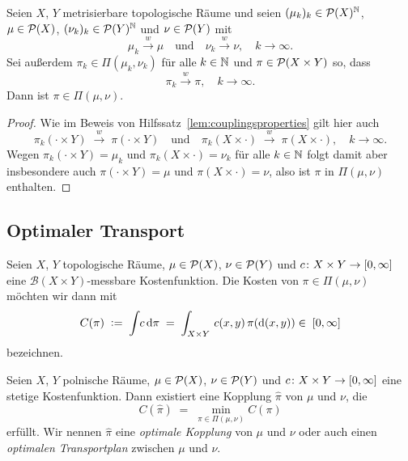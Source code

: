 \documentclass[../main/main.tex]{subfiles}
\begin{document}
	\begin{Hilfssatz}
		\label{lem:convimpliescouplingsconv}
		Seien $X$, $Y$ metrisierbare topologische Räume und seien $(\mu_k)_k \in \mathcal{P}(X)^{\mathbb{N}}$, $\mu \in \mathcal{P}(X)$, $(\nu_k)_k \in \mathcal{P}(Y)^{\mathbb{N}}$ und $\nu \in \mathcal{P}(Y)$ mit
		\[ \mu_k \xrightarrow{w} \mu \quad \text{und} \quad \nu_k \xrightarrow{w} \nu, \quad k \to \infty \text{.} \]
		Sei außerdem $\pi_k \in \Pi(\mu_k, \nu_k)$ für alle $k \in \mathbb{N}$ und $\pi \in \mathcal{P}(X \times Y)$ so, dass
		\[ \pi_k \xrightarrow{w} \pi, \quad k \to \infty \text{.} \]
		Dann ist $\pi \in \Pi(\mu, \nu)$.
	\end{Hilfssatz}

	\begin{proof}
		Wie im Beweis von Hilfssatz~\ref{lem:couplingsproperties} gilt hier auch
		\[ \pi_k(\cdot \times Y) \; \xrightarrow{w} \; \pi(\cdot \times Y) \quad \text{und} \quad \pi_k(X \times \cdot) \; \xrightarrow{w} \; \pi(X \times \cdot), \quad k \to \infty \text{.} \]
		Wegen $\pi_k(\cdot \times Y) = \mu_k$ und $\pi_k(X \times \cdot) = \nu_k$ für alle $k \in \mathbb{N}$ folgt damit aber insbesondere auch $\pi(\cdot \times Y) = \mu$ und $\pi(X \times \cdot) = \nu$, also
		ist $\pi$ in $\Pi(\mu, \nu)$ enthalten.
	\end{proof}

	\subsection{Optimaler Transport}

	\begin{Definition}
		Seien $X$, $Y$ topologische Räume, $\mu \in \mathcal{P}(X)$, $\nu \in \mathcal{P}(Y)$ und $c \colon X \times Y \to [0, \infty]$ eine $\mathcal{B}(X \times Y)$-messbare Kostenfunktion.
		Die Kosten von $\pi \in \Pi(\mu, \nu)$ möchten wir dann mit
		\[ C(\pi) \; \vcentcolon = \; \int_{} \, c \, \mathrm{d}\pi \; = \; \int_{X \times Y} \, c(x, y) \, \pi(\mathrm{d}(x, y)) \in \; [0, \infty] \]
		bezeichnen.
	\end{Definition}

	\begin{Satz}
		\label{thm:existenceoptimaltransportplan}
		Seien $X$, $Y$ polnische Räume, $\mu \in \mathcal{P}(X)$, $\nu \in \mathcal{P}(Y)$ und $c \colon X \times Y \to [0, \infty]$ eine stetige 
		Kostenfunktion. Dann existiert eine Kopplung $\hat{\pi}$ von $\mu$ und $\nu$, die 
		\[ C(\hat{\pi}) \; = \; \min_{\pi \in \Pi(\mu, \nu)} C(\pi) \]
		erfüllt. Wir nennen $\hat{\pi}$ eine \emph{optimale Kopplung} von $\mu$ und $\nu$ oder auch einen \emph{optimalen Transportplan} zwischen $\mu$ und $\nu$.
	\end{Satz}
\end{document}
